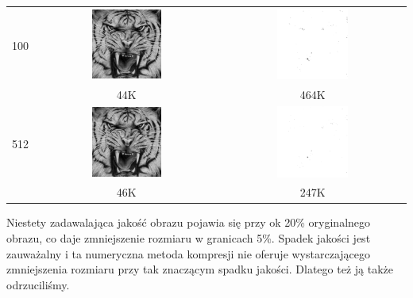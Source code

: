 \begin{center}
\begin{longtable}{|l|c|c|}
        \hline
        100 & \includegraphics[width=0.4\textwidth]{photos/photo_100.jpg} & \includegraphics[width=0.4\textwidth]{photos/photo_100.png} \\
        & 44K & 464K \\
        \hline
        512 & \includegraphics[width=0.4\textwidth]{photos/photo_512.jpg} & \includegraphics[width=0.4\textwidth]{photos/photo_512.png} \\
        & 46K & 247K \\
        \hline
    \end{longtable}
\end{center}

Niestety zadawalająca jakość obrazu pojawia się przy ok 20\% oryginalnego obrazu, co daje zmniejszenie
rozmiaru w granicach 5\%. Spadek jakości jest zauważalny i ta numeryczna metoda kompresji nie oferuje
wystarczającego zmniejszenia rozmiaru przy tak znaczącym spadku jakości. Dlatego też ją także odrzuciliśmy.
